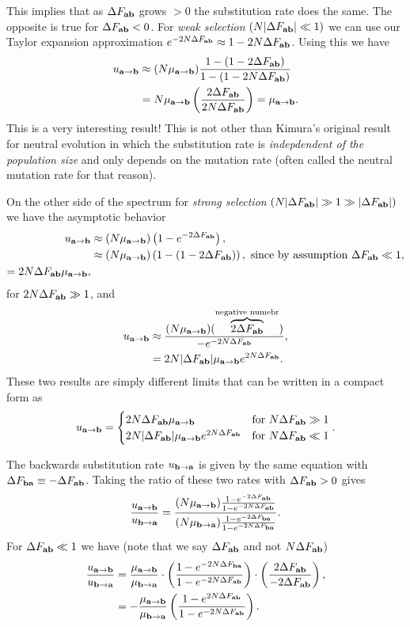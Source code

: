 This implies that as $\DF$ grows $> 0$ the substitution rate does the same. The
opposite is true for $\DF < 0$. For {\it weak selection}
$(N \lvert \DF \rvert \ll 1)$ we can use our Taylor expansion approximation
$e^{-2 N \DF} \approx 1 - 2 N \DF$. Using this we have
\begin{align}
  u_\atob &\approx (N \mu_\atob) {1 - (1 - 2 \DF) \over 1 - (1 - 2 N \DF)}\\
  &= N \mu_\atob \left( 2 \DF \over 2 N \DF \right) = \mu_\atob.
\end{align}
This is a very interesting result! This is not other than Kimura's original
result for neutral evolution in which the substitution rate is {\it
indepdendent of the population size} and only depends on the mutation rate
(often called the neutral mutation rate for that reason).

On the other side of the spectrum for {\it strong selection}
$(N \lvert \DF \rvert \gg 1 \gg \lvert \DF \rvert)$ we have the asymptotic
behavior
\begin{align}
  u_\atob &\approx (N \mu_\atob) \left( 1 - e^{-2 \DF} \right),\\
  &\approx (N \mu_\atob) \left( 1 - (1 - 2 \DF) \right),
  \text{ since by assumption } \DF \ll 1, \\
  = 2 N \DF \mu_\atob,
\end{align}
for $2 N \DF \gg 1$, and
\begin{align}
  u_\atob &\approx {(N \mu_\atob) (\overbrace{2 \DF}^{\text{negative numebr}})
  \over -e^{-2 N \DF}},\\
  &= 2 N \lvert \DF \rvert \mu_\atob e^{2 N \DF}.
\end{align}
These two results are simply different limits that can be written in a compact
form as
\begin{equation}
  u_\atob =
  \begin{cases}
    2 N \DF \mu_\atob & \text{for } N \DF \gg 1\\
    2 N \lvert \DF \rvert \mu_\atob e^{2 N \DF} & \text{for } N \DF \ll 1
  \end{cases}.
\end{equation}

The backwards substitution rate $u_\btoa$ is given by the same equation with
$\Delta F_{\bb{ba}} \equiv - \DF$. Taking the ratio of these two rates with
$\DF > 0$ gives
\begin{equation}
  {u_\atob \over u_\btoa} = {(N \mu_\atob)
  {1 - e^{-2 \DF} \over 1 - e^{-2 N \DF}} \over
  (N \mu_\btoa) {1 - e^{-2 \Delta F_{\bb{ba}}} \over
  1 - e^{-2 N \Delta F_{\bb{ba}}}}}.
\end{equation}
For $\DF \ll 1$ we have (note that we say $\DF$ and not $N \DF$)
\begin{align}
  {u_\atob \over u_\btoa} &= {\mu_\atob \over \mu_\btoa} \cdot
  \left( {1 - e^{-2 N \Delta F_{\bb{ba}}} \over 1 - e^{-2N \DF}} \right)\cdot
  \left( {2 \DF \over - 2 \DF} \right),\\
  &= - {\mu_\atob \over \mu_\btoa}
  \left( {1 - e^{2 N \DF} \over 1 - e^{-2N \DF}} \right).
\end{align}

